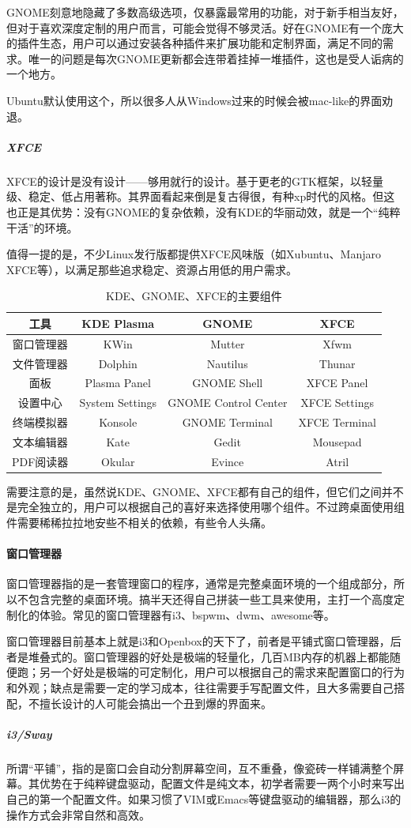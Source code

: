 GNOME刻意地隐藏了多数高级选项，仅暴露最常用的功能，对于新手相当友好，但对于喜欢深度定制的用户而言，可能会觉得不够灵活。好在GNOME有一个庞大的插件生态，用户可以通过安装各种插件来扩展功能和定制界面，满足不同的需求。唯一的问题是每次GNOME更新都会连带着挂掉一堆插件，这也是受人诟病的一个地方。

Ubuntu默认使用这个，所以很多人从Windows过来的时候会被mac-like的界面劝退。

\subparagraph{XFCE} XFCE的设计是没有设计——够用就行的设计。基于更老的GTK框架，以轻量级、稳定、低占用著称。其界面看起来倒是复古得很，有种xp时代的风格。但这也正是其优势：没有GNOME的复杂依赖，没有KDE的华丽动效，就是一个“纯粹干活”的环境。

值得一提的是，不少Linux发行版都提供XFCE风味版（如Xubuntu、Manjaro XFCE等），以满足那些追求稳定、资源占用低的用户需求。

\begin{table}[h]
\centering
\begin{tabular}{c|c|c|c}
  \toprule
  工具 & KDE Plasma & GNOME & XFCE \\
  \midrule
  窗口管理器 & KWin & Mutter & Xfwm \\
  文件管理器 & Dolphin & Nautilus & Thunar \\
  面板 & Plasma Panel & GNOME Shell & XFCE Panel \\
  设置中心 & System Settings & GNOME Control Center & XFCE Settings \\
  终端模拟器 & Konsole & GNOME Terminal & XFCE Terminal \\
  文本编辑器 & Kate & Gedit & Mousepad \\
  PDF阅读器 & Okular & Evince & Atril \\
  \bottomrule
\end{tabular}
\caption{KDE、GNOME、XFCE的主要组件}
\end{table}
需要注意的是，虽然说KDE、GNOME、XFCE都有自己的组件，但它们之间并不是完全独立的，用户可以根据自己的喜好来选择使用哪个组件。不过跨桌面使用组件需要稀稀拉拉地安些不相关的依赖，有些令人头痛。

\paragraph{窗口管理器} 窗口管理器指的是一套管理窗口的程序，通常是完整桌面环境的一个组成部分，所以不包含完整的桌面环境。搞半天还得自己拼装一些工具来使用，主打一个高度定制化的体验。常见的窗口管理器有i3、bspwm、dwm、awesome等。

窗口管理器目前基本上就是i3和Openbox的天下了，前者是平铺式窗口管理器，后者是堆叠式的。窗口管理器的好处是极端的轻量化，几百MB内存的机器上都能随便跑；另一个好处是极端的可定制化，用户可以根据自己的需求来配置窗口的行为和外观；缺点是需要一定的学习成本，往往需要手写配置文件，且大多需要自己搭配，不擅长设计的人可能会搞出一个丑到爆的界面来。
\subparagraph{i3/Sway} 所谓“平铺”，指的是窗口会自动分割屏幕空间，互不重叠，像瓷砖一样铺满整个屏幕。其优势在于纯粹键盘驱动，配置文件是纯文本，初学者需要一两个小时来写出自己的第一个配置文件。如果习惯了VIM或Emacs等键盘驱动的编辑器，那么i3的操作方式会非常自然和高效。

